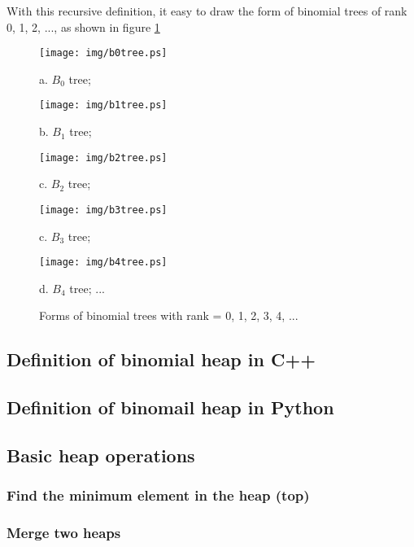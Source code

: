 \documentclass{article}
\begin{document}
With this recursive definition, it easy to draw the form of binomial trees
of rank 0, 1, 2, ..., as shown in figure \ref{fig:bitree-forms}

\begin{figure}[htbp]
       \begin{center}
       	  \texttt{[image: img/b0tree.ps]}

          a. $B_0$ tree; 

          \texttt{[image: img/b1tree.ps]}

          b. $B_1$ tree;

          \texttt{[image: img/b2tree.ps]}

          c. $B_2$ tree;

          \texttt{[image: img/b3tree.ps]}

          c. $B_3$ tree;

          \texttt{[image: img/b4tree.ps]}

          d. $B_4$ tree; ...

        \caption{Forms of binomial trees with rank = 0, 1, 2, 3, 4, ...} \label{fig:bitree-forms}
       \end{center}
\end{figure}


\subsection*{Definition of binomial heap in C++}

\subsection*{Definition of binomail heap in Python}

\subsection{Basic heap operations}

\subsubsection{Find the minimum element in the heap (top)}

\subsubsection{Merge two heaps}
\end{document}
